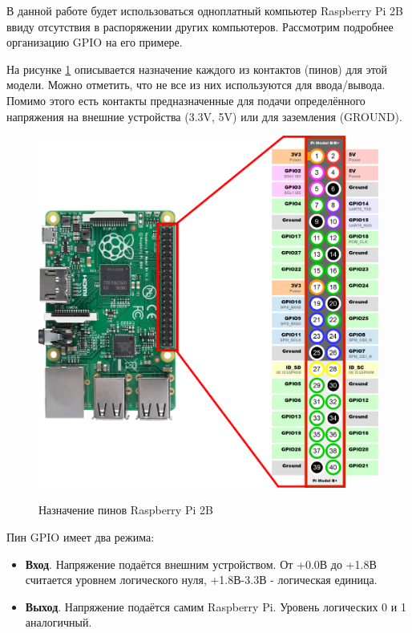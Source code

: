 В данной работе будет использоваться одноплатный компьютер Raspberry Pi 2B ввиду отсутствия в распоряжении других компьютеров. Рассмотрим подробнее организацию GPIO на его примере.

На рисунке \ref{pic:gpio} описывается назначение каждого из контактов (пинов)  для этой модели. Можно отметить, что не все из них используются для ввода/вывода. Помимо этого есть контакты предназначенные для подачи определённого напряжения на внешние устройства (3.3V, 5V) или для заземления (GROUND).

\begin{figure}[h!] 
	\begin{center}
		{\includegraphics[scale=0.15, angle=0]{img/gpio.pdf}}
		\caption{Назначение пинов Raspberry Pi 2B}
		\label{pic:gpio}
	\end{center}
\end{figure}

Пин GPIO имеет два режима:
\begin{itemize}
	\item \textbf{Вход}. Напряжение подаётся внешним устройством. От +0.0В до +1.8В считается уровнем логического нуля, +1.8В-3.3В - логическая единица.
	\item \textbf{Выход}. Напряжение подаётся самим Raspberry Pi. Уровень логических 0 и 1 аналогичный.
\end{itemize}

